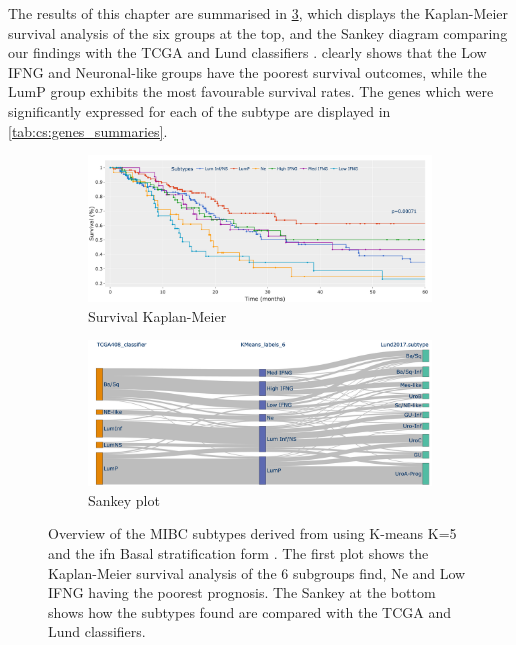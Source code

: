 The results of this chapter are summarised in \cref{fig:cs:overview_K_means_6}, which displays the Kaplan-Meier survival analysis of the six groups at the top, and the Sankey diagram comparing our findings with the TCGA and Lund classifiers \citet{Robertson2017-mg,Marzouka2018-ge}.  clearly shows that the Low IFNG and Neuronal-like groups have the poorest survival outcomes, while the LumP group exhibits the most favourable survival rates. The genes which were significantly expressed for each of the subtype are displayed in \cref{tab:cs:genes_summaries}.
 
\begin{figure}[!htb]
    \centering
    \begin{subfigure}[!t]{1.0\textwidth}
        \includegraphics[width=\textwidth,keepaspectratio]{Sections/ClusteringAnalysis/Resources/discussion/survival_K_6.png}    
        \caption{Survival Kaplan-Meier}
        \label{fig:cs:overview_survival}
    \end{subfigure}
    \centering
    \begin{subfigure}[!t]{1.0\textwidth}
        \includegraphics[width=\textwidth,keepaspectratio]{Sections/ClusteringAnalysis/Resources/discussion/KMeans_6_comp.png}
        \caption{Sankey plot}
        \label{fig:cs:overview_comp}
    \end{subfigure} 
    \centering
    \caption{Overview of the MIBC subtypes derived from using K-means K=5 and the \acrshort{ifn} Basal stratification form \citet{Baker2022-bj}. The first plot shows the Kaplan-Meier survival analysis of the 6 subgroups find, Ne and Low IFNG having the poorest prognosis. The Sankey at the bottom shows how the subtypes found are compared with the TCGA \citet{Robertson2017-mg} and Lund \citet{Marzouka2018-ge} classifiers.} 
    \label{fig:cs:overview_K_means_6}
\end{figure}


